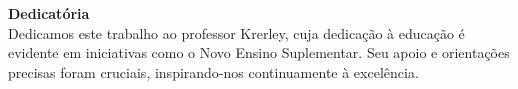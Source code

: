 \vspace*{\fill}

\hspace{8cm}
\begin{minipage}{0.5\textwidth}
    \raggedright
    \textbf{Dedicatória} \\[10pt]
Dedicamos este trabalho ao professor Krerley, cuja dedicação à educação é evidente em iniciativas como o Novo Ensino Suplementar. Seu apoio e orientações precisas foram cruciais, inspirando-nos continuamente à excelência.
\end{minipage}
\newpage
